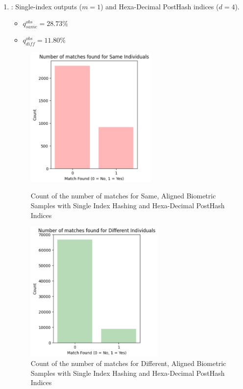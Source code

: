 \begin{enumerate}
    \item {}: Single-index outputs (\(m=1\)) and Hexa-Decimal PostHash indices (\(d=4\)).
    \begin{itemize}
        \item \(q_{same}^{obs} = 28.73\%\)
        \item \(q_{diff}^{obs} = 11.80\%\)
    \end{itemize}

    \begin{figure}[H]
        \centering
        \begin{minipage}[b]{0.48\linewidth}
            \centering
            \includegraphics[width=\linewidth,height=7cm,keepaspectratio]{latex-img/d4same.png}
            \caption{Count of the number of matches for Same, Aligned Biometric Samples with Single Index Hashing and Hexa-Decimal PostHash Indices}
            \label{mu_same}
        \end{minipage}
        \hfill
        \begin{minipage}[b]{0.48\linewidth}
            \centering
            \includegraphics[width=\linewidth,height=7cm,keepaspectratio]{latex-img/d4diff.png}
            \caption{Count of the number of matches for Different, Aligned Biometric Samples with Single Index Hashing and Hexa-Decimal PostHash Indices}
            \label{mu_diff}
        \end{minipage}
    \end{figure}
\end{enumerate}

